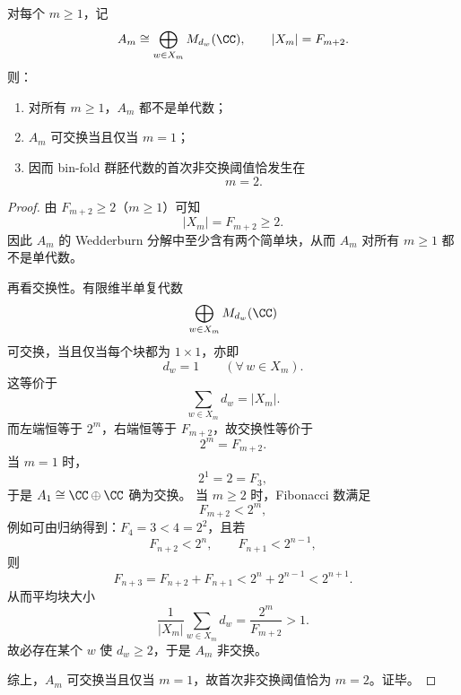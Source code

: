 \begin{proposition}\label{prop:xi-time-part60acb-binfold-first-noncommutative-threshold}
对每个 \(m\ge 1\)，记
\[
A_m\cong \bigoplus_{w\in X_m}M_{d_w}(\CC),
\qquad
|X_m|=F_{m+2}.
\]
则：
\begin{enumerate}
  \item 对所有 \(m\ge 1\)，\(A_m\) 都不是单代数；
  \item \(A_m\) 可交换当且仅当 \(m=1\)；
  \item 因而 bin-fold 群胚代数的首次非交换阈值恰发生在
  \[
  \boxed{\;m=2.\;}
  \]
\end{enumerate}
\end{proposition}
\begin{proof}
由 \(F_{m+2}\ge 2\)（\(m\ge 1\)）可知
\[
|X_m|=F_{m+2}\ge 2.
\]
因此 \(A_m\) 的 Wedderburn 分解中至少含有两个简单块，从而 \(A_m\) 对所有 \(m\ge 1\) 都不是单代数。

再看交换性。有限维半单复代数
\[
\bigoplus_{w\in X_m}M_{d_w}(\CC)
\]
可交换，当且仅当每个块都为 \(1\times 1\)，亦即
\[
d_w=1
\qquad (\forall\,w\in X_m).
\]
这等价于
\[
\sum_{w\in X_m}d_w=|X_m|.
\]
而左端恒等于 \(2^m\)，右端恒等于 \(F_{m+2}\)，故交换性等价于
\[
2^m=F_{m+2}.
\]
当 \(m=1\) 时，
\[
2^1=2=F_3,
\]
于是 \(A_1\cong \CC\oplus \CC\) 确为交换。
当 \(m\ge 2\) 时，Fibonacci 数满足
\[
F_{m+2}<2^m,
\]
例如可由归纳得到：\(F_4=3<4=2^2\)，且若
\[
F_{n+2}<2^n,\qquad F_{n+1}<2^{n-1},
\]
则
\[
F_{n+3}=F_{n+2}+F_{n+1}<2^n+2^{n-1}<2^{n+1}.
\]
从而平均块大小
\[
\frac{1}{|X_m|}\sum_{w\in X_m}d_w=\frac{2^m}{F_{m+2}}>1.
\]
故必存在某个 \(w\) 使 \(d_w\ge 2\)，于是 \(A_m\) 非交换。

综上，\(A_m\) 可交换当且仅当 \(m=1\)，故首次非交换阈值恰为 \(m=2\)。证毕。
\end{proof}

\endinput
